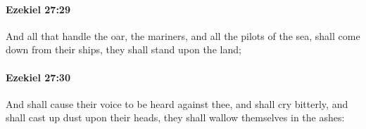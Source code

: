 		\paragraph{Ezekiel 27:29} %
			\label{EZEKIEL-27-29}

			And all that handle the oar, the mariners, and all the pilots of the sea, shall come down from their ships, they shall stand upon the land;


		\paragraph{Ezekiel 27:30} %
			\label{EZEKIEL-27-30}

			And shall cause their voice to be heard against thee, and shall cry bitterly, and shall cast up dust upon their heads, they shall wallow themselves in the ashes:


